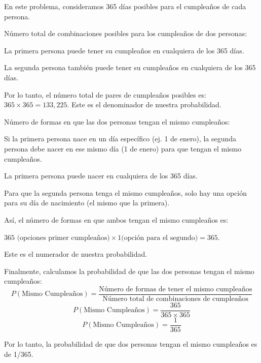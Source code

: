 En este problema, consideramos 365 días posibles para el cumpleaños de cada persona.

Número total de combinaciones posibles para los cumpleaños de dos personas:

La primera persona puede tener su cumpleaños en cualquiera de los 365 días.

La segunda persona también puede tener su cumpleaños en cualquiera de los 365 días.

Por lo tanto, el número total de pares de cumpleaños posibles es: $365 \times 365 = 133,225$.
Este es el denominador de nuestra probabilidad.

Número de formas en que las dos personas tengan el mismo cumpleaños:

Si la primera persona nace en un día específico (ej. 1 de enero), la segunda persona debe nacer en ese 
mismo día (1 de enero) para que tengan el mismo cumpleaños.

La primera persona puede nacer en cualquiera de los 365 días.

Para que la segunda persona tenga el mismo cumpleaños, solo hay una opción para su día de nacimiento 
(el mismo que la primera).

Así, el número de formas en que ambos tengan el mismo cumpleaños es: 
        
$365 \text{ (opciones primer cumpleaños)} \times 1 \text{(opción para el segundo)} = 365$.

Este es el numerador de nuestra probabilidad.

Finalmente, calculamos la probabilidad de que las dos personas tengan el mismo cumpleaños:
$$P(\text{Mismo Cumpleaños}) = \frac{\text{Número de formas de tener el mismo cumpleaños}}{\text{Número total de combinaciones de cumpleaños}}$$
$$P(\text{Mismo Cumpleaños}) = \frac{365}{365 \times 365}$$
$$P(\text{Mismo Cumpleaños}) = \frac{1}{365}$$

Por lo tanto, la probabilidad de que dos personas tengan el mismo cumpleaños es de 1/365.

\newpage